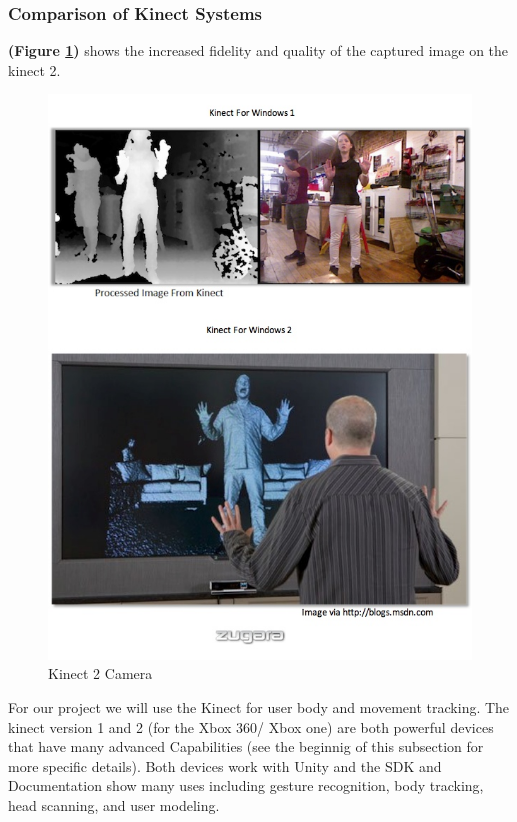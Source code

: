 \documentclass[a4paper,10pt]{article}
\begin{document}
\subsubsection{Comparison of Kinect Systems}
\textbf{(Figure \ref{fig:kimg})} shows the increased fidelity and quality of the captured image on the kinect 2.
\begin{figure}[H]
	\centerline{\includegraphics[scale=0.4]{kinectImg.jpg}}
	\caption{Kinect 2 Camera}
	\label{fig:kimg}
	\end{figure}
	For our project we will use the Kinect for user body and movement tracking. The kinect version 1 and 2 (for the Xbox 360/ Xbox one) are both powerful devices that have many 
	advanced Capabilities (see the beginnig of this subsection for more specific details). Both devices work with Unity and the SDK and Documentation show many uses including gesture 
	recognition, body tracking, head scanning, and user modeling.
	\pagebreak	
\end{document}
